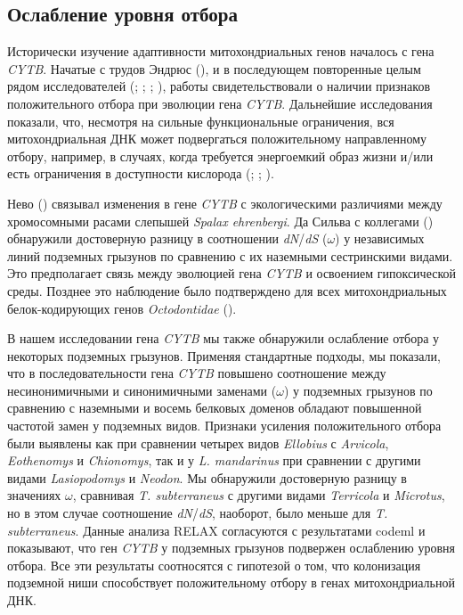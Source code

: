 \subsection{Ослабление уровня отбора}

Исторически изучение адаптивности митохондриальных генов началось с гена \textit{CYTB}. Начатые с трудов Эндрюс (\cite{Andrews1998}), и в последующем повторенные целым рядом исследователей (\cite{Tomasco2014}; \cite{DaSilva2009}; \cite{DiRocco2006}; \cite{Shao2015}), работы свидетельствовали о наличии признаков положительного отбора при эволюции гена \textit{CYTB}. Дальнейшие исследования показали, что, несмотря на сильные функциональные ограничения, вся митохондриальная ДНК может подвергаться положительному направленному отбору, например, в случаях, когда требуется энергоемкий образ жизни и/или есть ограничения в доступности кислорода (\cite{Tomasco2011}; \cite{Shen2010}; \cite{Blier2001}).

Нево (\cite{Nevo1999}) связывал изменения в гене \textit{CYTB} с экологическими различиями между хромосомными расами слепышей \textit{Spalax ehrenbergi}. Да Сильва с коллегами (\cite{DaSilva2009}) обнаружили достоверную разницу в соотношении \textit{dN}/\textit{dS} ($\omega$) у независимых линий подземных грызунов по сравнению с их наземными сестринскими видами. Это предполагает связь между эволюцией гена \textit{CYTB} и освоением гипоксической среды. Позднее это наблюдение было подтверждено для всех митохондриальных белок-кодирующих генов \textit{Octodontidae} (\cite{Tomasco2011}).

В нашем исследовании гена \textit{CYTB} мы также обнаружили ослабление отбора у некоторых подземных грызунов. Применяя стандартные подходы, мы показали, что в последовательности гена \textit{CYTB} повышено соотношение между несинонимичными и синонимичными заменами ($\omega$) у подземных грызунов по сравнению с наземными и восемь белковых доменов обладают повышенной частотой замен у подземных видов. Признаки усиления положительного отбора были выявлены как при сравнении четырех видов \textit{Ellobius} с \textit{Arvicola}, \textit{Eothenomys} и \textit{Chionomys}, так и у \textit{L. mandarinus} при сравнении с другими видами \textit{Lasiopodomys} и \textit{Neodon}. Мы обнаружили достоверную разницу в значениях $\omega$, сравнивая \textit{T. subterraneus} с другими видами \textit{Terricola} и \textit{Microtus}, но в этом случае соотношение \textit{dN}/\textit{dS}, наоборот, было меньше для \textit{T. subterraneus}. Данные анализа RELAX согласуются с результатами codeml и показывают, что ген \textit{CYTB} у подземных грызунов подвержен ослаблению уровня отбора. Все эти результаты соотносятся с гипотезой о том, что колонизация подземной ниши способствует положительному отбору в генах митохондриальной ДНК.


